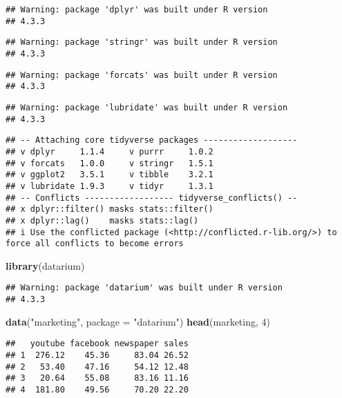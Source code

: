 \documentclass[
]{article}
\newenvironment{Shaded}{\begin{snugshade}}{\end{snugshade}}
\newcommand{\AttributeTok}[1]{\textcolor[rgb]{0.13,0.29,0.53}{#1}}
\newcommand{\DecValTok}[1]{\textcolor[rgb]{0.00,0.00,0.81}{#1}}
\newcommand{\FunctionTok}[1]{\textcolor[rgb]{0.13,0.29,0.53}{\textbf{#1}}}
\newcommand{\NormalTok}[1]{#1}
\newcommand{\StringTok}[1]{\textcolor[rgb]{0.31,0.60,0.02}{#1}}
\begin{document}
\begin{verbatim}
## Warning: package 'dplyr' was built under R version
## 4.3.3
\end{verbatim}

\begin{verbatim}
## Warning: package 'stringr' was built under R version
## 4.3.3
\end{verbatim}

\begin{verbatim}
## Warning: package 'forcats' was built under R version
## 4.3.3
\end{verbatim}

\begin{verbatim}
## Warning: package 'lubridate' was built under R version
## 4.3.3
\end{verbatim}

\begin{verbatim}
## -- Attaching core tidyverse packages -------------------
## v dplyr     1.1.4     v purrr     1.0.2
## v forcats   1.0.0     v stringr   1.5.1
## v ggplot2   3.5.1     v tibble    3.2.1
## v lubridate 1.9.3     v tidyr     1.3.1
## -- Conflicts ------------------ tidyverse_conflicts() --
## x dplyr::filter() masks stats::filter()
## x dplyr::lag()    masks stats::lag()
## i Use the conflicted package (<http://conflicted.r-lib.org/>) to force all conflicts to become errors
\end{verbatim}

\begin{Shaded}
\begin{Highlighting}[]
\FunctionTok{library}\NormalTok{(datarium)}
\end{Highlighting}
\end{Shaded}

\begin{verbatim}
## Warning: package 'datarium' was built under R version
## 4.3.3
\end{verbatim}

\begin{Shaded}
\begin{Highlighting}[]
\FunctionTok{data}\NormalTok{(}\StringTok{"marketing"}\NormalTok{, }\AttributeTok{package =} \StringTok{"datarium"}\NormalTok{)}
\FunctionTok{head}\NormalTok{(marketing, }\DecValTok{4}\NormalTok{)}
\end{Highlighting}
\end{Shaded}

\begin{verbatim}
##   youtube facebook newspaper sales
## 1  276.12    45.36     83.04 26.52
## 2   53.40    47.16     54.12 12.48
## 3   20.64    55.08     83.16 11.16
## 4  181.80    49.56     70.20 22.20
\end{verbatim}
\end{document}
